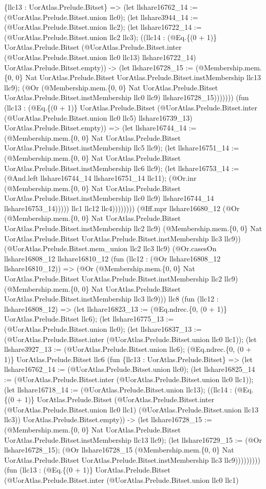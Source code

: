 \documentclass[11pt]{article}
\begin{document}
\{llc13 : UorAtlas.Prelude.Bitset\} => (let llshare16762\_14 := (@UorAtlas.Prelude.Bitset.union llc0); (let llshare3944\_14 := (@UorAtlas.Prelude.Bitset.union llc2); (let llshare16722\_14 := (@UorAtlas.Prelude.Bitset.union llc2 llc3); ((llc14 : (@Eq.\{(0 + 1)\} UorAtlas.Prelude.Bitset (@UorAtlas.Prelude.Bitset.inter (@UorAtlas.Prelude.Bitset.union llc0 llc13) llshare16722\_14) UorAtlas.Prelude.Bitset.empty)) -> (let llshare16728\_15 := (@Membership.mem.\{0, 0\} Nat UorAtlas.Prelude.Bitset UorAtlas.Prelude.Bitset.instMembership llc13 llc9); (@Or (@Membership.mem.\{0, 0\} Nat UorAtlas.Prelude.Bitset UorAtlas.Prelude.Bitset.instMembership llc0 llc9) llshare16728\_15))))))) (fun (llc13 : (@Eq.\{(0 + 1)\} UorAtlas.Prelude.Bitset (@UorAtlas.Prelude.Bitset.inter (@UorAtlas.Prelude.Bitset.union llc0 llc5) llshare16739\_13) UorAtlas.Prelude.Bitset.empty)) => (let llshare16744\_14 := (@Membership.mem.\{0, 0\} Nat UorAtlas.Prelude.Bitset UorAtlas.Prelude.Bitset.instMembership llc5 llc9); (let llshare16751\_14 := (@Membership.mem.\{0, 0\} Nat UorAtlas.Prelude.Bitset UorAtlas.Prelude.Bitset.instMembership llc6 llc9); (let llshare16753\_14 := (@And.left llshare16744\_14 llshare16751\_14 llc11); (@Or.inr (@Membership.mem.\{0, 0\} Nat UorAtlas.Prelude.Bitset UorAtlas.Prelude.Bitset.instMembership llc0 llc9) llshare16744\_14 llshare16753\_14))))) llc1 llc12 llc4)))))))) (@Iff.mpr llshare16680\_12 (@Or (@Membership.mem.\{0, 0\} Nat UorAtlas.Prelude.Bitset UorAtlas.Prelude.Bitset.instMembership llc2 llc9) (@Membership.mem.\{0, 0\} Nat UorAtlas.Prelude.Bitset UorAtlas.Prelude.Bitset.instMembership llc3 llc9)) (@UorAtlas.Prelude.Bitset.mem\_union llc2 llc3 llc9) (@Or.casesOn llshare16808\_12 llshare16810\_12 (fun (llc12 : (@Or llshare16808\_12 llshare16810\_12)) => (@Or (@Membership.mem.\{0, 0\} Nat UorAtlas.Prelude.Bitset UorAtlas.Prelude.Bitset.instMembership llc2 llc9) (@Membership.mem.\{0, 0\} Nat UorAtlas.Prelude.Bitset UorAtlas.Prelude.Bitset.instMembership llc3 llc9))) llc8 (fun (llc12 : llshare16808\_12) => (let llshare16823\_13 := (@Eq.ndrec.\{0, (0 + 1)\} UorAtlas.Prelude.Bitset llc6); (let llshare16775\_13 := (@UorAtlas.Prelude.Bitset.union llc0); (let llshare16837\_13 := (@UorAtlas.Prelude.Bitset.inter (@UorAtlas.Prelude.Bitset.union llc0 llc1)); (let llshare3927\_13 := (@UorAtlas.Prelude.Bitset.union llc6); (@Eq.ndrec.\{0, (0 + 1)\} UorAtlas.Prelude.Bitset llc6 (fun \{llc13 : UorAtlas.Prelude.Bitset\} => (let llshare16762\_14 := (@UorAtlas.Prelude.Bitset.union llc0); (let llshare16825\_14 := (@UorAtlas.Prelude.Bitset.inter (@UorAtlas.Prelude.Bitset.union llc0 llc1)); (let llshare16718\_14 := (@UorAtlas.Prelude.Bitset.union llc13); ((llc14 : (@Eq.\{(0 + 1)\} UorAtlas.Prelude.Bitset (@UorAtlas.Prelude.Bitset.inter (@UorAtlas.Prelude.Bitset.union llc0 llc1) (@UorAtlas.Prelude.Bitset.union llc13 llc3)) UorAtlas.Prelude.Bitset.empty)) -> (let llshare16728\_15 := (@Membership.mem.\{0, 0\} Nat UorAtlas.Prelude.Bitset UorAtlas.Prelude.Bitset.instMembership llc13 llc9); (let llshare16729\_15 := (@Or llshare16728\_15); (@Or llshare16728\_15 (@Membership.mem.\{0, 0\} Nat UorAtlas.Prelude.Bitset UorAtlas.Prelude.Bitset.instMembership llc3 llc9))))))))) (fun (llc13 : (@Eq.\{(0 + 1)\} UorAtlas.Prelude.Bitset (@UorAtlas.Prelude.Bitset.inter (@UorAtlas.Prelude.Bitset.union llc0 llc1) 
\end{document}
